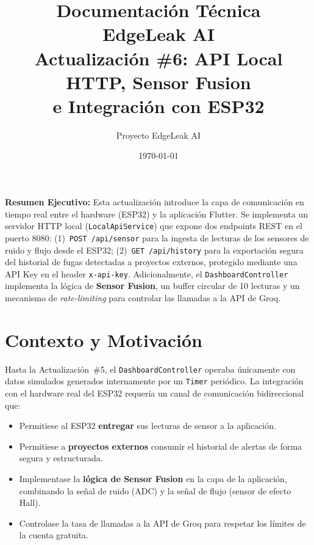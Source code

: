 \documentclass[12pt,a4paper]{article}
\title{
  \Huge\textbf{Documentación Técnica}\\[0.5em]
  \Large\textcolor{primaryblue}{EdgeLeak AI}\\[0.3em]
  \large Actualización \#6: API Local HTTP, Sensor Fusion\\
  e Integración con ESP32
}
\author{Proyecto EdgeLeak AI}
\date{\today}
\begin{document}
\maketitle
\thispagestyle{fancy}

\begin{mdframed}[linecolor=primaryblue,linewidth=1.5pt]
\textbf{Resumen Ejecutivo:} Esta actualización introduce la capa de comunicación en tiempo
real entre el hardware (ESP32) y la aplicación Flutter. Se implementa un servidor HTTP
local (\texttt{LocalApiService}) que expone dos endpoints REST en el puerto 8080:
(1)~\texttt{POST /api/sensor} para la ingesta de lecturas de los sensores de ruido y flujo
desde el ESP32; (2)~\texttt{GET /api/history} para la exportación segura del historial
de fugas detectadas a proyectos externos, protegido mediante una API Key en el header
\texttt{x-api-key}. Adicionalmente, el \texttt{DashboardController} implementa la lógica
de \textbf{Sensor Fusion}, un buffer circular de 10 lecturas y un mecanismo de
\textit{rate-limiting} para controlar las llamadas a la API de Groq.
\end{mdframed}

\vspace{1em}
\tableofcontents
\newpage

\section{Contexto y Motivación}

Hasta la Actualización~\#5, el \texttt{DashboardController} operaba únicamente con datos
simulados generados internamente por un \texttt{Timer} periódico. La integración con el
hardware real del ESP32 requería un canal de comunicación bidireccional que:

\begin{itemize}[leftmargin=2em]
  \item Permitiese al ESP32 \textbf{entregar} sus lecturas de sensor a la aplicación.
  \item Permitiese a \textbf{proyectos externos} consumir el historial de alertas de forma
        segura y estructurada.
  \item Implementase la \textbf{lógica de Sensor Fusion} en la capa de la aplicación,
        combinando la señal de ruido (ADC) y la señal de flujo (sensor de efecto Hall).
  \item Controlase la tasa de llamadas a la API de Groq para respetar los límites de la
        cuenta gratuita.
\end{itemize}
\end{document}
